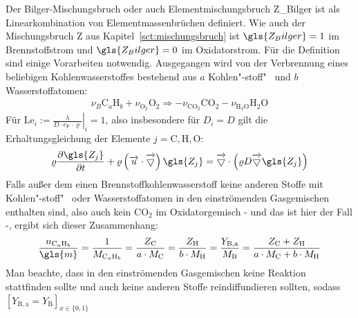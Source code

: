 Der Bilger-Mischungsbruch oder auch Elementmischungsbruch \gls{Z_Bilger} ist als Linearkombination von Elementmassenbrüchen definiert. Wie auch der Mischungsbruch \gls{Z} aus Kapitel~\ref{sct:mischungsbruch} ist $\gls{Z_Bilger}=1$ im Brennstoffstrom und $\gls{Z_Bilger}=0$ im Oxidatorstrom. Für die Definition sind einige Vorarbeiten notwendig. Ausgegangen wird von der Verbrennung eines beliebigen Kohlenwasserstoffes bestehend aus $a$ Kohlen"-stoff"~ und $b$ Wasserstoffatomen:
\begin{align}
    \label{eq:khreaktion}
    \nu_B \mathrm{C}_a \mathrm{H}_b + \nu_{\mathrm{O}_2} \mathrm{O}_2 \Rightarrow
    - \nu_{\mathrm{CO}_2} \mathrm{CO}_2 - \nu_{\mathrm{H}_2\mathrm{O}} \mathrm{H}_2\mathrm{O}
\end{align}
Für $\mathrm{Le}_i := \left. \frac{\lambda}{D\cdot c_\mathrm{P}\cdot\varrho} \right|_i = 1$, also insbesondere für $D_i=D$ gilt die Erhaltungsgleichung der Elemente $j=\mathrm{C,H,O}$:
\begin{align}
    \varrho \fpart{ \gls{Z_j} }{t} + \varrho \left( \vec{u}\cdot\nabla \right) \gls{Z_j} = \nabla\cdot\left(\varrho D \nabla \gls{Z_j} \right)
\end{align}
Falls außer dem einen Brennstoffkohlenwasserstoff keine anderen Stoffe mit Kohlen"-stoff"~ oder Wasserstoffatomen in den einströmenden Gasgemischen enthalten sind, also auch kein $\mathrm{CO}_2$ im Oxidatorgemisch - und das ist hier der Fall -, ergibt sich dieser Zusammenhang:
\begin{align}
    \label{eq:khmasses}
    \frac{ n_{\mathrm{C}_a \mathrm{H}_b} }{ \gls{m} } =
    \frac{ 1 }{ M_{\mathrm{C}_a \mathrm{H}_b} } =
    \frac{ Z_{\mathrm{C}} }{ a\cdot M_\mathrm{C} } =
    \frac{ Z_{\mathrm{H}} }{ b\cdot M_\mathrm{H} } =
    \frac{ Y_{\mathrm{B},\mathrm{a}} }{ M_\mathrm{B} } =
    \frac{ Z_\mathrm{C} + Z_\mathrm{H} }{ a\cdot M_\mathrm{C} + b\cdot M_\mathrm{H} }
\end{align}
Man beachte, dass in den einströmenden Gasgemischen keine Reaktion stattfinden sollte und auch keine anderen Stoffe reindiffundieren sollten, sodass $\left[Y_{\mathrm{B},\mathrm{a}} = Y_{\mathrm{B}} \right]_{x\in\lbrace 0,1 \rbrace}$

